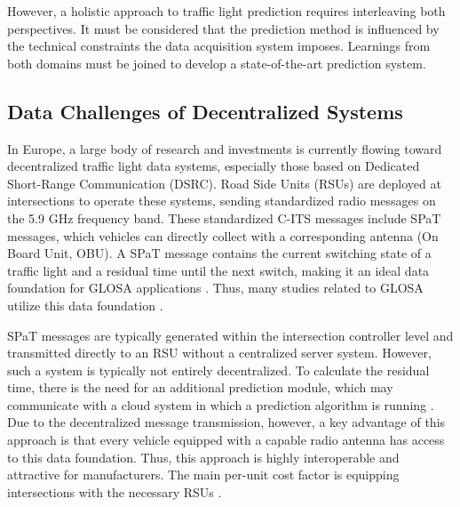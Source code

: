 However, a holistic approach to traffic light prediction requires interleaving both perspectives. It must be considered that the prediction method is influenced by the technical constraints the data acquisition system imposes. Learnings from both domains must be joined to develop a state-of-the-art prediction system.

\subsection{Data Challenges of Decentralized Systems}

In Europe, a large body of research and investments is currently flowing toward decentralized traffic light data systems, especially those based on Dedicated Short-Range Communication (DSRC). Road Side Units (RSUs) are deployed at intersections to operate these systems, sending standardized radio messages on the 5.9 GHz frequency band. These standardized C-ITS messages include SPaT messages, which vehicles can directly collect with a corresponding antenna (On Board Unit, OBU). A SPaT message contains the current switching state of a traffic light and a residual time until the next switch, making it an ideal data foundation for GLOSA applications \cite{ibrahim_estimating_2019, wagner_spatmap_2023}. Thus, many studies related to GLOSA utilize this data foundation \cite{schweiger_elisatm_2011, rakha_eco-driving_2011, rakha_aeris_2012, li_open_2012, suramardhana_driver-centric_2014, xu_bb_2015, bernais_design_2016, nguyen_efficient_2016, choudhury_integrated_2016, stahlmann_multi-hop_2017, stahlmann_exploring_2018, plianos_predictive_2018, zhang_green_2020, chen_developing_2022}.

SPaT messages are typically generated within the intersection controller level \cite{zweck_traffic_2013} and transmitted directly to an RSU without a centralized server system. However, such a system is typically not entirely decentralized. To calculate the residual time, there is the need for an additional prediction module, which may communicate with a cloud system in which a prediction algorithm is running \cite{strobl_c-its_2019, neuner_leitfaden_2020}. Due to the decentralized message transmission, however, a key advantage of this approach is that every vehicle equipped with a capable radio antenna has access to this data foundation. Thus, this approach is highly interoperable and attractive for manufacturers. The main per-unit cost factor is equipping intersections with the necessary RSUs \cite{niebel_cost-benefit-based_2013}.

